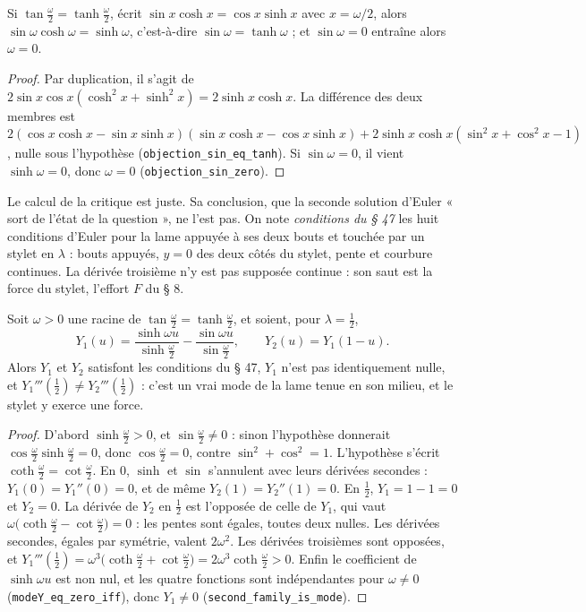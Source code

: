 \begin{enonce}
Si $\tan\frac\omega2 = \tanh\frac\omega2$, écrit $\sin x\cosh x = \cos x\sinh x$ avec $x = \omega/2$, alors $\sin\omega\cosh\omega = \sinh\omega$, c'est-à-dire $\sin\omega = \tanh\omega$ ; et $\sin\omega = 0$ entraîne alors $\omega = 0$.
\end{enonce}

\begin{proof}
Par duplication, il s'agit de $2\sin x\cos x(\cosh^2x + \sinh^2x) = 2\sinh x\cosh x$. La différence des deux membres est $2(\cos x\cosh x - \sin x\sinh x)(\sin x\cosh x - \cos x\sinh x) + 2\sinh x\cosh x(\sin^2x + \cos^2x - 1)$, nulle sous l'hypothèse (\texttt{objection\_sin\_eq\_tanh}). Si $\sin\omega = 0$, il vient $\sinh\omega = 0$, donc $\omega = 0$ (\texttt{objection\_sin\_zero}).
\end{proof}

Le calcul de la critique est juste. Sa conclusion, que la seconde solution d'Euler « sort de l'état de la question », ne l'est pas. On note \emph{conditions du § 47} les huit conditions d'Euler pour la lame appuyée à ses deux bouts et touchée par un stylet en $\lambda$ : bouts appuyés, $y = 0$ des deux côtés du stylet, pente et courbure continues. La dérivée troisième n'y est pas supposée continue : son saut est la force du stylet, l'effort $F$ du § 8.

\begin{contrexemple}
Soit $\omega > 0$ une racine de $\tan\frac\omega2 = \tanh\frac\omega2$, et soient, pour $\lambda = \frac12$,
\[
Y_1(u) = \frac{\sinh\omega u}{\sinh\frac\omega2} - \frac{\sin\omega u}{\sin\frac\omega2}, \qquad Y_2(u) = Y_1(1-u).
\]
Alors $Y_1$ et $Y_2$ satisfont les conditions du § 47, $Y_1$ n'est pas identiquement nulle, et $Y_1'''(\frac12) \neq Y_2'''(\frac12)$ : c'est un vrai mode de la lame tenue en son milieu, et le stylet y exerce une force.
\end{contrexemple}

\begin{proof}
D'abord $\sinh\frac\omega2 > 0$, et $\sin\frac\omega2 \neq 0$ : sinon l'hypothèse donnerait $\cos\frac\omega2\sinh\frac\omega2 = 0$, donc $\cos\frac\omega2 = 0$, contre $\sin^2 + \cos^2 = 1$. L'hypothèse s'écrit $\coth\frac\omega2 = \cot\frac\omega2$. En $0$, $\sinh$ et $\sin$ s'annulent avec leurs dérivées secondes : $Y_1(0) = Y_1''(0) = 0$, et de même $Y_2(1) = Y_2''(1) = 0$. En $\frac12$, $Y_1 = 1 - 1 = 0$ et $Y_2 = 0$. La dérivée de $Y_2$ en $\frac12$ est l'opposée de celle de $Y_1$, qui vaut $\omega\bigl(\coth\frac\omega2 - \cot\frac\omega2\bigr) = 0$ : les pentes sont égales, toutes deux nulles. Les dérivées secondes, égales par symétrie, valent $2\omega^2$. Les dérivées troisièmes sont opposées, et $Y_1'''(\frac12) = \omega^3\bigl(\coth\frac\omega2 + \cot\frac\omega2\bigr) = 2\omega^3\coth\frac\omega2 > 0$. Enfin le coefficient de $\sinh\omega u$ est non nul, et les quatre fonctions sont indépendantes pour $\omega \neq 0$ (\texttt{modeY\_eq\_zero\_iff}), donc $Y_1 \neq 0$ (\texttt{second\_family\_is\_mode}).
\end{proof}

